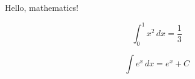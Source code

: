 \documentclass{article}
\begin{document}
Hello, mathematics!

\[
\int_0^1 x^2\,dx = \frac{1}{3}
\]

\[
\int e^x \, dx = e^x + C
\]
\end{document}
